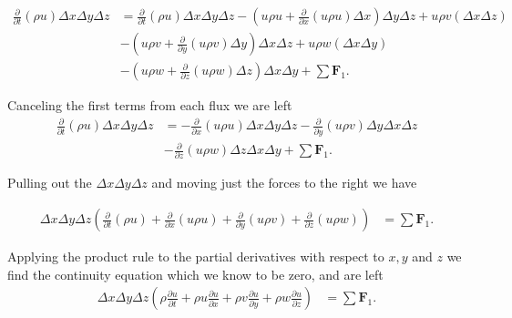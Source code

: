 \begin{align*} \frac{\partial }{\partial t} \left ( \rho u \right) \Delta x \Delta y \Delta z &= \frac{\partial }{\partial t} \left ( \rho u \right) \Delta x \Delta y \Delta z  - \left ( u\rho u + \frac{\partial}{\partial x} \left( u\rho u\right ) \Delta x \right ) \Delta y \Delta z +  u \rho v (\Delta x \Delta z) \\
& - \left ( u\rho v + \frac{\partial}{\partial y} \left( u\rho v\right ) \Delta y \right ) \Delta x \Delta z + u \rho w (\Delta x \Delta y)\\
& - \left ( u\rho w + \frac{\partial}{\partial z} \left( u\rho w\right ) \Delta z \right ) \Delta x \Delta y + \sum \mathbf{F}_1.\end{align*}

Canceling the first terms from each flux we are left
\begin{align*} \frac{\partial }{\partial t} \left ( \rho u \right) \Delta x \Delta y \Delta z &=  -  \frac{\partial}{\partial x} \left( u\rho u\right ) \Delta x  \Delta y \Delta z - \frac{\partial}{\partial y} \left( u\rho v\right ) \Delta y \Delta x \Delta z\\
& - \frac{\partial}{\partial z} \left( u\rho w\right ) \Delta z \Delta x \Delta y + \sum \mathbf{F}_1.\end{align*}

Pulling out the $\Delta x \Delta y \Delta z$ and moving just the forces to the right we have

\begin{align*} \Delta x \Delta y \Delta z \left (\frac{\partial }{\partial t} \left ( \rho u \right)  +  \frac{\partial}{\partial x} \left( u\rho u\right )  + \frac{\partial}{\partial y} \left( u\rho v\right ) +\frac{\partial}{\partial z} \left( u\rho w\right ) \right ) &= \sum \mathbf{F}_1.\end{align*}

Applying the product rule to the partial derivatives with respect to $x,y$ and $z$ we find the continuity equation which we know to be zero, and are left
\begin{align*} \Delta x \Delta y \Delta z \left ( \rho \frac{\partial u }{\partial t} + \rho u \frac{\partial u }{\partial x} + \rho v \frac{\partial u}{\partial y} + \rho w \frac{\partial u}{\partial z} \right ) &= \sum \mathbf{F}_1 .\end{align*}


